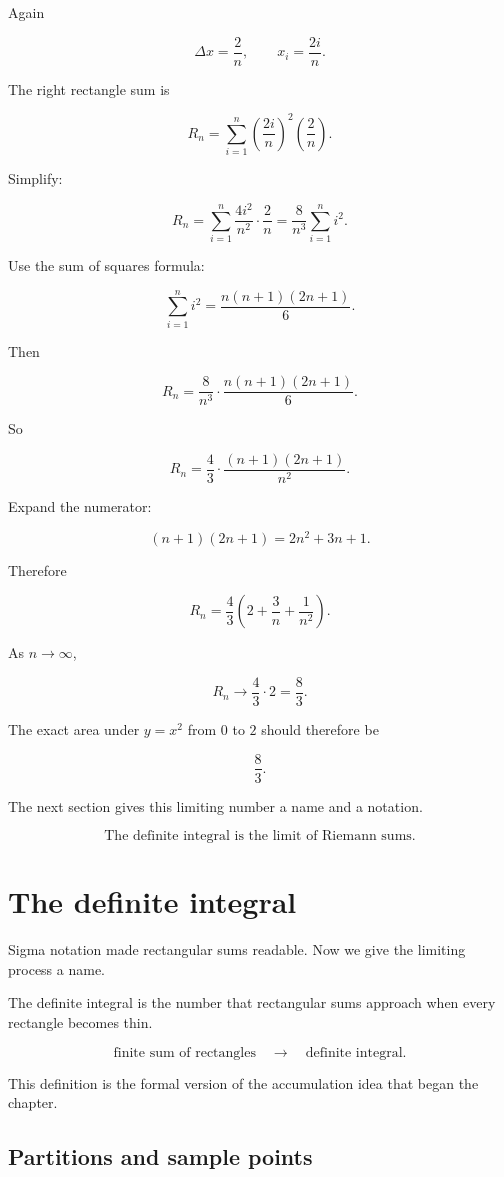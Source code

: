 Again

\[
\Delta x=\frac{2}{n},
\qquad
x_i=\frac{2i}{n}.
\]

The right rectangle sum is

\[
R_n
=
\sum_{i=1}^{n}
\left(\frac{2i}{n}\right)^2
\left(\frac{2}{n}\right).
\]

Simplify:

\[
R_n
=
\sum_{i=1}^{n}
\frac{4i^2}{n^2}\cdot \frac{2}{n}
=
\frac{8}{n^3}\sum_{i=1}^{n}i^2.
\]

Use the sum of squares formula:

\[
\sum_{i=1}^{n}i^2
=
\frac{n(n+1)(2n+1)}{6}.
\]

Then

\[
R_n
=
\frac{8}{n^3}\cdot
\frac{n(n+1)(2n+1)}{6}.
\]

So

\[
R_n
=
\frac{4}{3}\cdot
\frac{(n+1)(2n+1)}{n^2}.
\]

Expand the numerator:

\[
(n+1)(2n+1)=2n^2+3n+1.
\]

Therefore

\[
R_n
=
\frac{4}{3}
\left(
2+\frac{3}{n}+\frac{1}{n^2}
\right).
\]

As \(n\to\infty\),

\[
R_n\to
\frac{4}{3}\cdot2
=
\frac{8}{3}.
\]

The exact area under \(y=x^2\) from \(0\) to \(2\) should therefore be

\[
\frac{8}{3}.
\]

The next section gives this limiting number a name and a notation.

\[
\boxed{
\text{The definite integral is the limit of Riemann sums.}
}
\]

\section{The definite integral}
\label{sec:definite-integral}

Sigma notation made rectangular sums readable.  Now we give the limiting process a
name.

The definite integral is the number that rectangular sums approach when every
rectangle becomes thin.

\[
\text{finite sum of rectangles}
\quad\longrightarrow\quad
\text{definite integral}.
\]

This definition is the formal version of the accumulation idea that began the chapter.

\subsection{Partitions and sample points}
\label{subsec:partitions-sample-points}

